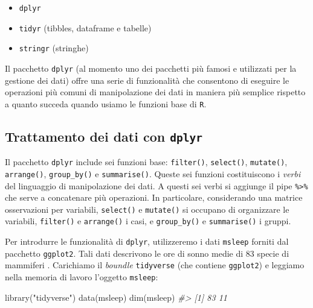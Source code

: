 \documentclass[
  10pt,
  italian,
  a4paper,
  extrafontsizes,onecolumn,openright
  ]{memoir}
\newenvironment{Shaded}{\begin{snugshade}}{\end{snugshade}}
\newcommand{\CommentTok}[1]{\textcolor[rgb]{0.56,0.35,0.01}{\textit{#1}}}
\newcommand{\FunctionTok}[1]{\textcolor[rgb]{0.00,0.00,0.00}{#1}}
\newcommand{\NormalTok}[1]{#1}
\newcommand{\StringTok}[1]{\textcolor[rgb]{0.31,0.60,0.02}{#1}}
\providecommand{\tightlist}{%
  \setlength{\itemsep}{0pt}\setlength{\parskip}{0pt}}
\begin{document}
\begin{itemize}
\tightlist
\item
  \texttt{dplyr}
\item
  \texttt{tidyr} (tibbles, dataframe e tabelle)
\item
  \texttt{stringr} (stringhe)
\end{itemize}

Il pacchetto \texttt{dplyr} (al momento uno dei pacchetti più famosi e utilizzati per la gestione dei dati) offre una serie di funzionalità che consentono di eseguire le operazioni più comuni di manipolazione dei dati in maniera più semplice rispetto a quanto succeda quando usiamo le funzioni base di \texttt{R}.

\hypertarget{trattamento-dei-dati-con-dplyr}{%
\subsection{\texorpdfstring{Trattamento dei dati con \texttt{dplyr}}{Trattamento dei dati con dplyr}}\label{trattamento-dei-dati-con-dplyr}}

Il pacchetto \texttt{dplyr} include sei funzioni base: \texttt{filter()}, \texttt{select()}, \texttt{mutate()}, \texttt{arrange()}, \texttt{group\_by()} e \texttt{summarise()}. Queste sei funzioni costituiscono i \emph{verbi} del linguaggio di manipolazione dei dati. A questi sei verbi si aggiunge il pipe \texttt{\%\textgreater{}\%} che serve a concatenare più operazioni. In particolare, considerando una matrice osservazioni per variabili, \texttt{select()} e \texttt{mutate()} si occupano di organizzare le variabili, \texttt{filter()} e \texttt{arrange()} i casi, e \texttt{group\_by()} e \texttt{summarise()} i gruppi.

Per introdurre le funzionalità di \texttt{dplyr}, utilizzeremo i dati \texttt{msleep} forniti dal pacchetto \texttt{ggplot2}. Tali dati descrivono le ore di sonno medie di 83 specie di mammiferi \autocite{savage2007scaling}. Carichiamo il \emph{boundle} \texttt{tidyverse} (che contiene \texttt{ggplot2}) e leggiamo nella memoria di lavoro l'oggetto \texttt{msleep}:

\begin{Shaded}
\begin{Highlighting}[]
\FunctionTok{library}\NormalTok{(}\StringTok{"tidyverse"}\NormalTok{)}
\FunctionTok{data}\NormalTok{(msleep)}
\FunctionTok{dim}\NormalTok{(msleep)}
\CommentTok{\#\textgreater{} [1] 83 11}
\end{Highlighting}
\end{Shaded}
\end{document}
